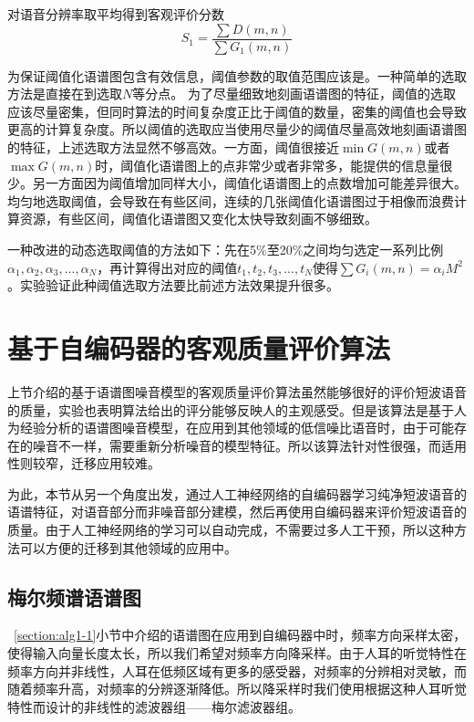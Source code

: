 对语音分辨率取平均得到客观评价分数
\begin{equation}\label{eq:score}
S_1 = \frac{\sum D(m,n)}{\sum G_1(m,n)}
\end{equation}

为保证阈值化语谱图包含有效信息，阈值参数的取值范围应该是。一种简单的选取方法是直接在到选取$N$等分点。
为了尽量细致地刻画语谱图的特征，阈值的选取应该尽量密集，但同时算法的时间复杂度正比于阈值的数量，密集的阈值也会导致更高的计算复杂度。所以阈值的选取应当使用尽量少的阈值尽量高效地刻画语谱图的特征，上述选取方法显然不够高效。一方面，阈值很接近$\min{G(m,n)}$或者$\max{G(m,n)}$时，阈值化语谱图上的点非常少或者非常多，能提供的信息量很少。另一方面因为阈值增加同样大小，阈值化语谱图上的点数增加可能差异很大。均匀地选取阈值，会导致在有些区间，连续的几张阈值化语谱图过于相像而浪费计算资源，有些区间，阈值化语谱图又变化太快导致刻画不够细致。

一种改进的动态选取阈值的方法如下：先在5\%至20\%之间均匀选定一系列比例$\alpha_1,\alpha_2,\alpha_3,...,\alpha_N$，再计算得出对应的阈值$t_1,t_2,t_3,...,t_N$使得$\sum G_i(m,n)=\alpha_i M^2$。实验验证此种阈值选取方法要比前述方法效果提升很多。


\section{基于自编码器的客观质量评价算法}

上节介绍的基于语谱图噪音模型的客观质量评价算法虽然能够很好的评价短波语音的质量，实验也表明算法给出的评分能够反映人的主观感受。但是该算法是基于人为经验分析的语谱图噪音模型，在应用到其他领域的低信噪比语音时，由于可能存在的噪音不一样，需要重新分析噪音的模型特征。所以该算法针对性很强，而适用性则较窄，迁移应用较难。

为此，本节从另一个角度出发，通过人工神经网络的自编码器学习纯净短波语音的语谱特征，对语音部分而非噪音部分建模，然后再使用自编码器来评价短波语音的质量。由于人工神经网络的学习可以自动完成，不需要过多人工干预，所以这种方法可以方便的迁移到其他领域的应用中。

\subsection{梅尔频谱语谱图}

~\ref{section:alg1-1}小节中介绍的语谱图在应用到自编码器中时，频率方向采样太密，使得输入向量长度太长，所以我们希望对频率方向降采样。由于人耳的听觉特性在频率方向并非线性，人耳在低频区域有更多的感受器，对频率的分辨相对灵敏，而随着频率升高，对频率的分辨逐渐降低。所以降采样时我们使用根据这种人耳听觉特性而设计的非线性的滤波器组——梅尔滤波器组。

